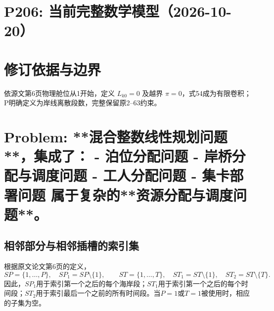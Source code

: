 \documentclass[11pt]{ctexart}
\begin{document}
\section*{P206: 当前完整数学模型（2026-10-20）}
\section*{修订依据与边界}依源文第6页物理舱位从1开始，定义 $L_{k0}=0$ 及越界 $\pi=0$，式54成为有限卷积；P明确定义为岸线离散段数，完整保留原2–63约束。


\section*{Problem: **混合整数线性规划问题**，集成了：
- 泊位分配问题
- 岸桥分配与调度问题
- 工人分配问题
- 集卡部署问题  
属于复杂的**资源分配与调度问题**。}



\subsection*{相邻部分与相邻插槽的索引集}
根据原文论文第6页的定义，
\[
SP=\{1,\ldots,P\},\quad SP_1=SP\setminus\{1\},\qquad
ST=\{1,\ldots,T\},\quad ST_1=ST\setminus\{1\},\quad ST_2=ST\setminus\{T\}.
\]
因此，$SP_1$用于索引第一个之后的每个海岸段；$ST_1$用于索引第一个之后的每个时间段；$ST_2$用于索引最后一个之前的所有时间段。当$P=1$或$T=1$被使用时，相应的子集为空。
\end{document}
